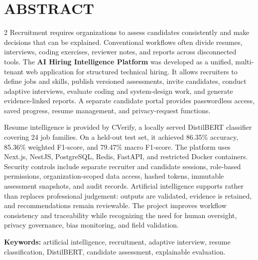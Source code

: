 \documentclass[12pt,a4paper,oneside]{report}
\begin{document}
\clearpage
\tableofcontents

\clearpage
{}
\listoffigures

\clearpage
{}
\listoftables

\clearpage
\chapter*{ABSTRACT}
\begin{spacing}{2}
\fontsize{14}{14}\selectfont
Recruitment requires organizations to assess candidates consistently and make
decisions that can be explained. Conventional workflows often divide resumes,
interviews, coding exercises, reviewer notes, and reports across disconnected tools.
The \textbf{AI Hiring Intelligence Platform} was developed as a unified, multi-tenant
web application for structured technical hiring. It allows recruiters to define jobs
and skills, publish versioned assessments, invite candidates, conduct adaptive
interviews, evaluate coding and system-design work, and generate evidence-linked
reports. A separate candidate portal provides passwordless access, saved progress,
resume management, and privacy-request functions.

Resume intelligence is provided by CVerify, a locally served DistilBERT classifier
covering 24 job families. On a held-out test set, it achieved 86.35\% accuracy,
85.36\% weighted F1-score, and 79.47\% macro F1-score. The platform uses Next.js,
NestJS, PostgreSQL, Redis, FastAPI, and restricted Docker containers. Security
controls include separate recruiter and candidate sessions, role-based permissions,
organization-scoped data access, hashed tokens, immutable assessment snapshots, and
audit records. Artificial intelligence supports rather than replaces professional
judgement: outputs are validated, evidence is retained, and recommendations remain
reviewable. The project improves workflow consistency and traceability while
recognizing the need for human oversight, privacy governance, bias monitoring, and
field validation.

\noindent\textbf{Keywords:} artificial intelligence, recruitment, adaptive interview,
resume classification, DistilBERT, candidate assessment, explainable evaluation.
\end{spacing}
\end{document}
